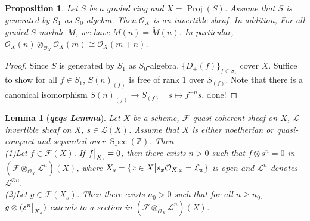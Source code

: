 \documentclass{ctexart}
\newtheorem{proposition}{Proposition}[section]
\newtheorem{lemma}{Lemma}[section]
\newcommand{\spec}{\operatorname{Spec}}
\newcommand{\proj}{\operatorname{Proj}}
\begin{document}
\begin{proposition}
    Let $S$ be a graded ring and $X = \proj(S)$.
    Assume that $S$ is generated by $S_{1}$ as $S_{0}$-algebra.
    Then $\mathcal{O}_{X}$ is an invertible sheaf.
    In addition, For all graded $S$-module $M$, we have $\widetilde{M(n)} = \widetilde{M}(n)$.
    In particular, $\mathcal{O}_{X}(n) \otimes_{\mathcal{O}_{X}} \mathcal{O}_{X}(m) \cong \mathcal{O}_{X}(m + n)$.
    \label{Proposition 1.10}
\end{proposition}
\begin{proof}
    Since $S$ is generated by $S_{1}$ as $S_{0}$-algebra, $\{D_{+}(f)\}_{f\in S_{1}}$ cover $X$.
    Suffice to show for all $f\in S_{1}$, $S(n)_{(f)}$ is free of rank $1$ over $S_{(f)}$.
    Note that there is a canonical isomorphism $S(n)_{(f)} \longrightarrow S_{(f)}\quad s \longmapsto f^{-n}s$, done! 
\end{proof}
\begin{lemma}[\textbf{\emph{qcqs Lemma}}]
    Let $X$ be a scheme, $\mathcal{F}$ quasi-coherent sheaf on $X$, $\mathcal{L}$ invertible sheaf on $X$, $s\in \mathcal{L}(X)$.
    Assume that $X$ is either noetherian or quasi-compact and separated over $\spec(\mathbb{Z})$.
    Then \\
    (1)Let $f\in \mathcal{F}(X)$.
    If $f\big{|}_{X_{s}} = 0$, then there exists $n > 0$ such that $f \otimes s^{n} = 0$ in $(\mathcal{F} \otimes_{\mathcal{O}_{X}} \mathcal{L}^{n})(X)$,
    where $X_{s} = \{x\in X \big{|} s_{x}\mathcal{O}_{X, x} = \mathcal{L}_{x}\}$ is open and $\mathcal{L}^{n}$ denotes $\mathcal{L}^{\otimes n}$. \\
    (2)Let $g\in \mathcal{F}(X_{s})$.
    Then there exists $n_{0} > 0$ such that for all $n \ge n_{0}$,
    $g \otimes (s^{n}\big{|}_{X_{s}})$ extends to a section in $(\mathcal{F} \otimes_{\mathcal{O}_{X}} \mathcal{L}^{n})(X)$.
    \label{Lemma 1.2}
\end{lemma}
\end{document}
